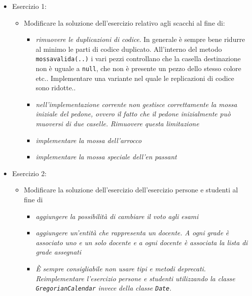 \documentclass{article}
\begin{document}
\begin{itemize}
\item Esercizio 1:
\begin{itemize}
\item Modificare la soluzione dell'esercizio relativo agli scacchi al fine di:
\begin{itemize}
\item \emph{rimuovere le duplicazioni di codice}. In generale \`e sempre bene ridurre al minimo le parti di codice duplicato. All'interno del metodo \texttt{mossavalida(..)} i vari pezzi controllano che la casella destinazione non \`e uguale a \texttt{null}, che non \`e presente un pezzo dello stesso colore etc.. Implementare una variante nel quale le replicazioni di codice sono ridotte..
\item \emph{nell'implementazione corrente non gestisce correttamente la mossa iniziale del pedone, ovvero il fatto che il pedone inizialmente pu\`o muoversi di due caselle. Rimuovere questa limitazione}
\item \emph{implementare la mossa dell'arrocco}
\item \emph{implementare la mossa speciale dell'en passant}
\end{itemize}
\end{itemize}
\item Esercizio 2:
\begin{itemize}
\item Modificare la soluzione dell'esercizio dell'esercizio persone e studenti al fine di
\begin{itemize}
\item \emph{aggiungere la possibilit\`a di cambiare il voto agli esami}
\item \emph{aggiungere un'entit\`a che rappresenta un docente. A ogni grade \`e associato uno e un solo docente e a ogni docente \`e associata la lista di grade assegnati}
\item \emph{\`E sempre consigliabile non usare tipi e metodi deprecati. Reimplementare l'esercizio persone e studenti utilizzando la classe \texttt{GregorianCalendar} invece della classe \texttt{Date}.}
\end{itemize}
\end{itemize}
\end{itemize}


\clearpage





%
%
\end{document}
